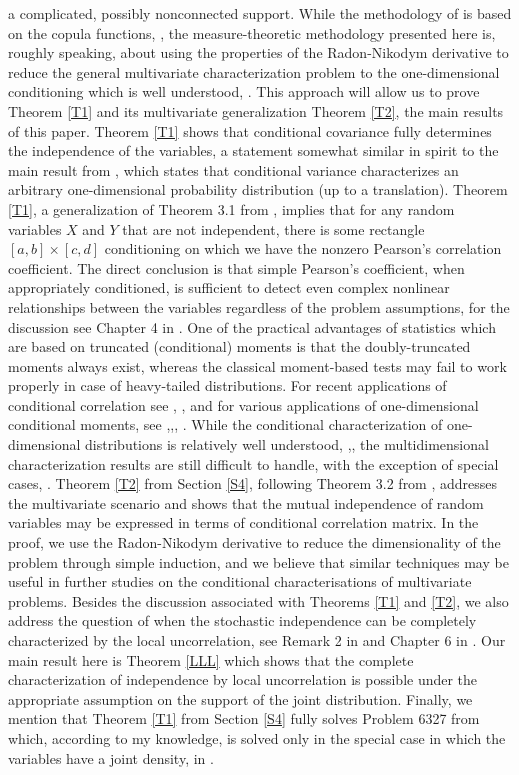 \documentclass[sn-mathphys,Numbered,11pt]{sn-jnl}%
\theoremstyle{thmstyleone}%
\begin{document}
a complicated, possibly nonconnected support. While the methodology of \cite{JJP} is based on the copula functions, \cite{Nelsen}, the measure-theoretic methodology presented here is, roughly speaking, about using the properties of the Radon-Nikodym derivative to reduce the general multivariate characterization problem  to the one-dimensional conditioning  which is well understood,  \cite{Navarro}. This approach will allow us  to prove Theorem \ref{T1} and its multivariate generalization Theorem \ref{T2}, the main results of this paper.  Theorem \ref{T1} shows that conditional covariance fully determines the independence of the variables, a statement somewhat similar in spirit to the main result from \cite{Jawor2}, which states that conditional variance  characterizes an arbitrary one-dimensional probability distribution (up to a translation). Theorem \ref{T1}, a generalization of  Theorem  3.1 from \cite{JJP}, implies that for any random variables $X$ and $Y$ that are not independent, there is some rectangle $[a,b]\times [c,d]$ conditioning on which we have the nonzero Pearson's correlation coefficient. The direct conclusion is that simple Pearson's coefficient, when appropriately conditioned, is sufficient to detect even complex nonlinear relationships between the variables regardless of the problem assumptions, for the discussion  see Chapter 4 in \cite{JJP}. One of the practical advantages of statistics which are based on truncated (conditional) moments is that the doubly-truncated moments always exist,  whereas the  classical moment-based tests may fail to work properly in case of heavy-tailed distributions. For recent applications of  conditional correlation see \cite{PJPW},  \cite{JJP}, and for various applications of one-dimensional conditional moments,  see  \cite{H},\cite{JEL},\cite{Pitera}, \cite{Multi}. While the conditional  characterization of one-dimensional distributions is relatively well understood, \cite{Nada},\cite{Navarro}, the multidimensional characterization results are still difficult to handle, with the exception of special cases, \cite{MW}. Theorem \ref{T2} from Section \ref{S4}, following Theorem 3.2 from \cite{JJP}, addresses the multivariate scenario and shows that the mutual independence of random variables may be expressed in terms of conditional correlation matrix. In the proof, we use the Radon-Nikodym derivative  to reduce the dimensionality of the problem through simple induction, and we believe that similar techniques may be useful in further studies on the conditional characterisations of multivariate problems. 
Besides the discussion associated with Theorems \ref{T1} and \ref{T2}, we also address the question of when the stochastic independence can be completely characterized  by the local uncorrelation, see Remark 2  in \cite{JJP} and Chapter 6 in \cite{DK}. Our main result here is Theorem \ref{LLL} which shows that the complete characterization of  independence by local uncorrelation is possible under the appropriate assumption on the support of the joint distribution.  Finally, we mention that Theorem \ref{T1} from Section \ref{S4} fully solves Problem 6327 from \cite{AP} which, according to my knowledge, is solved only  in the special case in which the variables have a joint density, in \cite{JJP}. 
\end{document}
